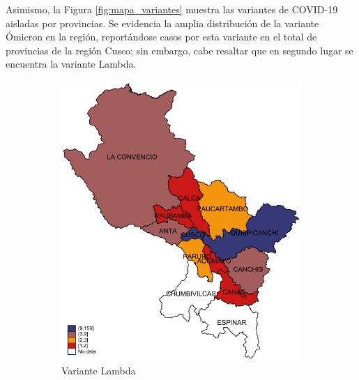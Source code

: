 \documentclass[12pt,a4paper,openany]{book}
\begin{document}
	Asimismo, la Figura \ref{fig:mapa_variantes} muestra las variantes de COVID-19 aisladas por provincias. Se evidencia la amplia distribución de la variante Ómicron en la región, reportándose casos por esta variante en el total de provincias de la región Cusco; sin embargo, cabe resaltar que en segundo lugar se encuentra la variante Lambda.
	
	\begin{figure}[h]
		\caption{Distribución provincial de las variantes de SARS-CoV-2 aisladas en la Región Cusco hasta la SE 39-2022.}
		\label{fig:mapa_variantes}
		\centering
		\begin{subfigure}[b]{0.40\textwidth}
			\centering
			\includegraphics[width=\textwidth]{../figuras/variantes_provincial_lambda.pdf}
			\caption{Variante Lambda}
		\end{subfigure}
		\hfill
		\begin{subfigure}[b]{0.40\textwidth}
			\centering

\end{subfigure}
\end{figure}
\end{document}
